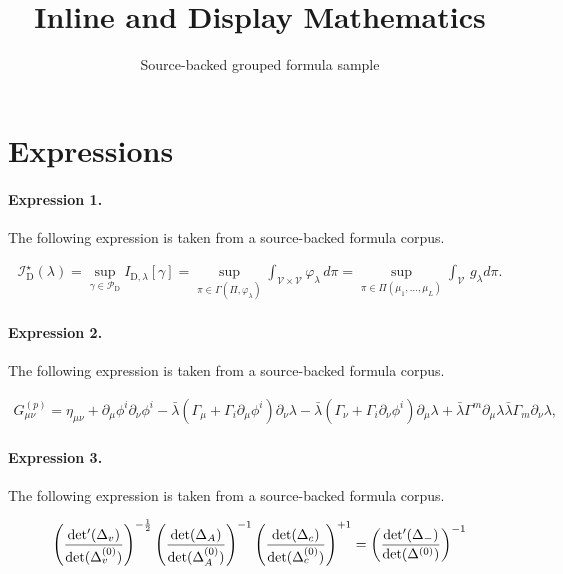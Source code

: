 \documentclass[11pt]{article}
\title{Inline and Display Mathematics}
\author{Source-backed grouped formula sample}
\date{}
\begin{document}
\maketitle
\section{Expressions}
\paragraph{Expression 1.} The following expression is taken from a source-backed formula corpus.

\begin{align*}\mathcal{I}_{\mathrm{D} }^\star (\lambda) = \sup_{\gamma \in \mathcal{P}_{\mathrm{D}} } I_{\mathrm{D}, \lambda}[\gamma] = \sup_{\pi \in \Gamma(\Pi, \varphi_\lambda ) } \int_{\mathcal{V} \times \mathcal{V} } \varphi_\lambda \, d\pi = \sup_{\pi \in \Pi(\mu_1, \ldots, \mu_L)} \int_{\mathcal{V} } \, g_\lambda d\pi. \end{align*}

\paragraph{Expression 2.} The following expression is taken from a source-backed formula corpus.

\begin{align*}G_{\mu\nu}^{(p)} = \eta_{\mu\nu} + \partial_\mu \phi^i\partial_\nu \phi^i - \bar\lambda (\Gamma_\mu + \Gamma_i \partial_\mu\phi^i)\partial_\nu \lambda- \bar\lambda (\Gamma_\nu + \Gamma_i \partial_\nu\phi^i)\partial_\mu \lambda+ \bar\lambda \Gamma^m \partial_\mu \lambda \bar\lambda \Gamma_m \partial_\nu \lambda,\end{align*}

\paragraph{Expression 3.} The following expression is taken from a source-backed formula corpus.

\begin{align*}\left(\frac{{\rm det'}(\Delta_{v})}{{\rm det}(\Delta^{(0)}_{v})}\right)^{-\frac{1}{2}}\left(\frac{{\rm det}(\Delta_{A})}{{\rm det}(\Delta^{(0)}_{A})}\right)^{-1}\left(\frac{{\rm det}(\Delta_{c})}{{\rm det}(\Delta^{(0)}_{c})}\right)^{+1} = \left(\frac{{\rm det'}(\Delta_{-})}{{\rm det}(\Delta^{(0)})}\right)^{-1}\end{align*}
\end{document}

